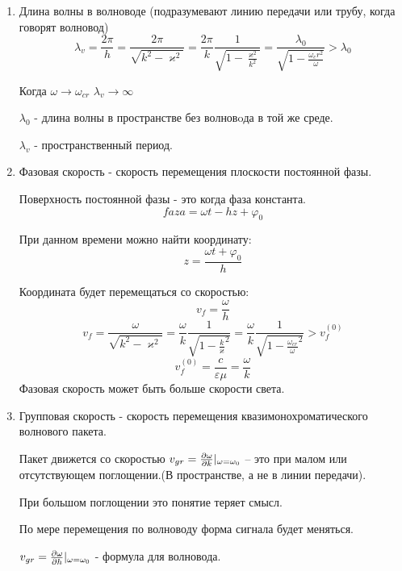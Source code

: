 \documentclass[a4paper,14pt]{extarticle}
\renewcommand{\phi}{\varphi}
\renewcommand{\kappa}{\varkappa}
\begin{document}
\begin{enumerate}
	
	\item Длина волны в волноводе (подразумевают линию передачи или трубу, когда говорят волновод)
	\begin{equation*}
	\lambda_v = \frac{2 \pi}{h} = \frac{2 \pi}{\sqrt{k^2 - \kappa^2}} = \frac{2 \pi}{k} \frac{1}{\sqrt{1 - \frac{\kappa^2}{k^2}}} = \frac{\lambda_0}{\sqrt{1 - \frac{\omega_cr^2}{\omega}}} > \lambda_0
	\end{equation*}
	
	Когда $\omega \rightarrow \omega_{cr}$	$\lambda_{v} \rightarrow \infty$
	
	$\lambda_0$ - длина волны в пространстве без волновoда в той же среде.
	
	$\lambda_{v}$ - пространственный период.
	
	\item Фазовая скорость - скорость перемещения плоскости постоянной фазы.
	
	Поверхность постоянной фазы - это когда фаза константа.
	\begin{equation*}
	faza = \omega t - h z + \phi_0
	\end{equation*}
	
	При данном времени можно найти координату:
	\begin{equation*}
	z = \frac{\omega t  + \phi_0}{ h }
	\end{equation*}
	
	Координата будет перемещаться со скоростью:
	\begin{equation*}
	v_f = \frac{\omega}{h}
	\end{equation*}
	\begin{equation*}
	v_f = 
	\frac{\omega}{\sqrt{k^2 - \kappa^2}} = 
	\frac{\omega}{k} \frac{1}{\sqrt{1 - {\frac{k}{\kappa}^2}}} = \frac{\omega}{k} \frac{1}{\sqrt{1 - {\frac{\omega_{cr}}{\omega}^2}}} > v_f^{(0)}
	\end{equation*}
	\begin{equation*}
	v_f^{(0)} = \frac{c}{\varepsilon \mu} = \frac{\omega}{k}
	\end{equation*}
	Фазовая скорость может быть больше скорости света.
	
	\item Групповая скорость - скорость перемещения квазимонохроматического волнового пакета. 	
	
	
	
	Пакет движется со скоростью $ v_{gr} = \pdv{\omega}{k}\vert_{\omega = \omega_{0}} $ -- это при малом или отсутствующем поглощении.(В пространстве, а не в линии передачи).
	
	При большом поглощении это понятие теряет смысл.
	
	По мере перемещения по волноводу форма сигнала будет меняться.
	
	$v_{gr} = \pdv{\omega}{h}\vert_{\omega = \omega_{0}} $ - формула для волновода. 
	
\end{enumerate}
\end{document}
